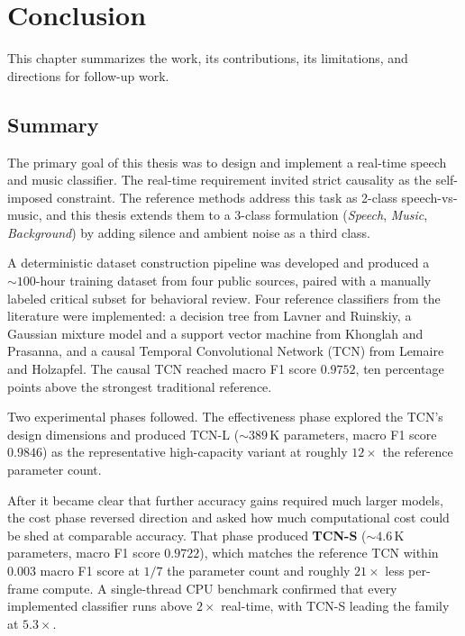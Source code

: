 \chapter{Conclusion}
\label{cap:conclusion}

This chapter summarizes the work, its contributions, its limitations, and directions for follow-up work.

\section{Summary}
\label{sec:conclusion_summary}

The primary goal of this thesis was to design and implement a real-time speech and music classifier.
The real-time requirement invited strict causality as the self-imposed constraint.
The reference methods address this task as 2-class speech-vs-music, and this thesis extends them to a 3-class formulation (\emph{Speech}, \emph{Music}, \emph{Background}) by adding silence and ambient noise as a third class.

A deterministic dataset construction pipeline was developed and produced a $\sim 100$-hour training dataset from four public sources, paired with a manually labeled critical subset for behavioral review.
Four reference classifiers from the literature were implemented: a decision tree from Lavner and Ruinskiy, a Gaussian mixture model and a support vector machine from Khonglah and Prasanna, and a causal Temporal Convolutional Network (TCN) from Lemaire and Holzapfel.
The causal TCN reached macro F1 score $0.9752$, ten percentage points above the strongest traditional reference.

Two experimental phases followed.
The effectiveness phase explored the TCN's design dimensions and produced TCN-L ($\sim 389$\,K parameters, macro F1 score $0.9846$) as the representative high-capacity variant at roughly $12\times$ the reference parameter count.

After it became clear that further accuracy gains required much larger models, the cost phase reversed direction and asked how much computational cost could be shed at comparable accuracy.
That phase produced \textbf{TCN-S} ($\sim 4.6$\,K parameters, macro F1 score $0.9722$), which matches the reference TCN within $0.003$ macro F1 score at $1/7$ the parameter count and roughly $21\times$ less per-frame compute.
A single-thread CPU benchmark confirmed that every implemented classifier runs above $2\times$ real-time, with TCN-S leading the family at $5.3\times$.


